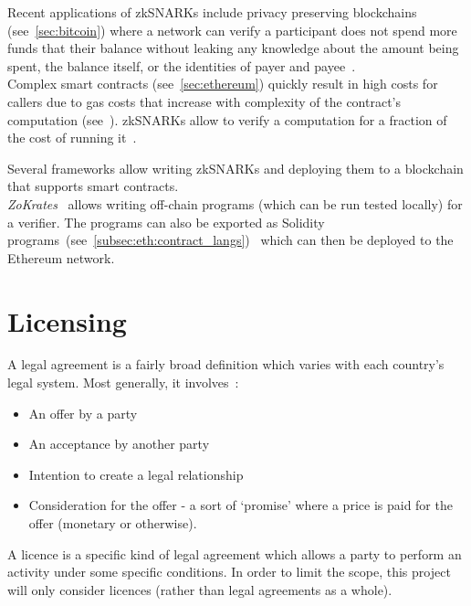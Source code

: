 Recent applications of zkSNARKs include privacy preserving blockchains (see~\ref{sec:bitcoin}) where a network can
verify a participant does not spend more funds that their balance without leaking any knowledge about the amount being
spent, the balance itself, or the identities of payer and payee~\cite{zerocash_whitepaper}.\\

Complex smart contracts (see~\ref{sec:ethereum}) quickly result in high costs for callers due to gas costs that increase with complexity of the
contract's computation (see~).
zkSNARKs allow to verify a computation for a fraction of the cost of running it~\cite{zokrates_intro}.

Several frameworks allow writing zkSNARKs and deploying them to a blockchain that supports smart contracts.\\

\textit{ZoKrates}~\cite{zokrates_repo} allows writing off-chain programs (which can be run tested locally) for a
verifier.
The programs can also be exported as Solidity programs~(see~\ref{subsec:eth:contract_langs})~\cite{solidity_repo} which
can then be deployed to the Ethereum network.


\section{Licensing}\label{sec:licensing}

A legal agreement is a fairly broad definition which varies with each country's legal system.
Most generally, it involves~\cite{contractDef2018precedent}:
\begin{itemize}
    \item An offer by a party
    \item An acceptance by another party
    \item Intention to create a legal relationship
    \item Consideration for the offer - a sort of `promise' where a price is paid for the offer (monetary or
    otherwise).
\end{itemize}

A licence is a specific kind of legal agreement which allows a party to perform an activity under some specific
conditions\cite{licenseDefinition}.
In order to limit the scope, this project will only consider licences (rather than legal agreements as a whole).

